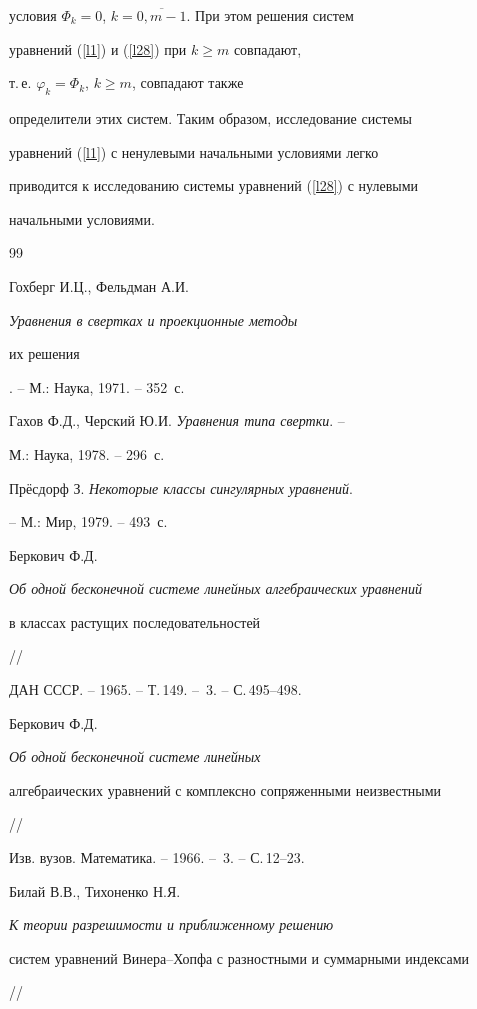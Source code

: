 условия $\Phi_k=0$, $k=\overline{0,m-1}$. При этом решения систем


уравнений (\ref{l1}) и (\ref{l28}) при $k\geqslant m$ совпадают,


т.\,е. $\varphi_k=\Phi_k$, $k\geqslant m$, совпадают также


определители этих систем. Таким образом, исследование системы


уравнений (\ref{l1}) с ненулевыми начальными условиями легко


приводится к исследованию системы уравнений (\ref{l28}) с нулевыми


начальными условиями.





\begin{thebibliography}{99}







Гохберг И.Ц., Фельдман А.И. {\em Уравнения в свертках и проекционные методы 


их решения}. -- М.: Наука, 1971. -- 352~с.




Гахов Ф.Д., Черский Ю.И. {\em Уравнения типа свертки}. --


М.: Наука, 1978. -- 296~с.




Пр\"есдорф З. {\em Некоторые классы сингулярных уравнений}.


-- М.: Мир, 1979. -- 493~с.




Беркович Ф.Д. {\em Об одной бесконечной системе линейных алгебраических уравнений


в классах растущих последовательностей} //


ДАН СССР. -- 1965. -- Т.\,149. -- \No\,3. -- С.\,495--498.




Беркович Ф.Д. {\em Об одной бесконечной системе линейных


алгебраических уравнений с комплексно сопряженными неизвестными} //


Изв. вузов. Математика. -- 1966. -- \No\,3. -- С.\,12--23.




Билай В.В., Тихоненко Н.Я. {\em К теории разрешимости и приближенному решению


систем уравнений Винера--Хопфа с разностными и суммарными индексами} //



\end{thebibliography}
